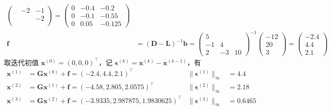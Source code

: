 \documentclass{sjtuarticle}
\begin{document}
\begin{itemize}
\begin{solution}
\begin{itemize}
\begin{description}
\begin{align*}
\begin{pmatrix}
                & -2 & -1 \\ & & -2 \\ &
            \end{pmatrix}
            =\begin{pmatrix}
                0 & -0.4 & -0.2 \\
                0 & -0.1 & -0.55 \\
                0 & 0.05 & -0.125
            \end{pmatrix}\\
            \bm{f}&=(\bm{D}-\bm{L})^{-1}\bm{b}=\begin{pmatrix}
                5 &  &  \\
                -1 & 4 &  \\
                2 & -3 & 10
            \end{pmatrix}^{-1}\begin{pmatrix}
                -12 \\ 20 \\ 3
            \end{pmatrix}=\begin{pmatrix}
                -2.4 \\ 4.4 \\ 2.1
            \end{pmatrix}
        \end{align*}
        取迭代初值 $\bm{x}^{(0)}=(0,0,0)^\top$，记 $\bm{\epsilon}^{(k)}=\bm{x}^{(k)}-\bm{x}^{(k-1)}$，有
        \begin{align*}
            \bm{x}^{(1)}&=\bm{G}\bm{x}^{(0)}+\bm{f}=\left(-2.4, 4.4, 2.1\right)^\top & \lVert\bm{\epsilon}^{(1)}\rVert_{\infty}&=4.4 \\
\bm{x}^{(2)}&=\bm{G}\bm{x}^{(1)}+\bm{f}=\left(-4.58, 2.805, 2.0575\right)^\top & \lVert\bm{\epsilon}^{(2)}\rVert_{\infty}&=2.18 \\
\bm{x}^{(3)}&=\bm{G}\bm{x}^{(2)}+\bm{f}=\left(-3.9335, 2.987875, 1.9830625\right)^\top & \lVert\bm{\epsilon}^{(3)}\rVert_{\infty}&=0.6465 \\

\end{align*}
\end{description}
\end{itemize}
\end{solution}
\end{itemize}
\end{document}
